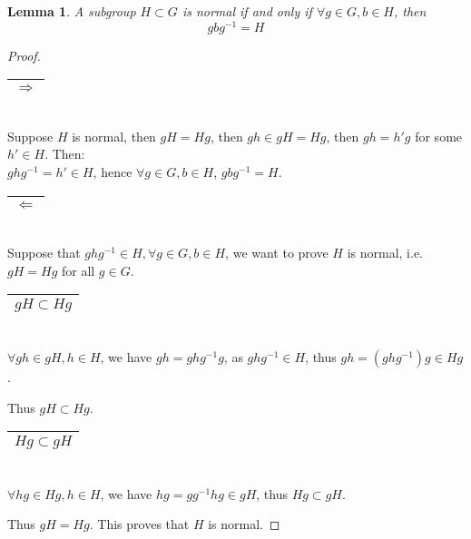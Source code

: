 \documentclass{article}
\theoremstyle{MyNonumberplain}
\theoremstyle{break}
\newtheorem*{proof}{Proof. }
\theoremstyle{break}
\newtheorem{lemma}[theorem]{Lemma}
\theoremstyle{break}
\theoremstyle{definition}
\theoremstyle{break}
\begin{document}
\begin{thmbox}
    \begin{lemma}
        A subgroup $H \subset G$ is normal if and only if $\forall g \in G, b \in H$,
        then
        \[ g b g^{- 1} = H \]
    \end{lemma}
    \begin{prfbox}
        \begin{proof}
            \begin{tabular}{|c|}
                \hline
                $\Rightarrow$\\
                \hline
              \end{tabular}\\
              
              Suppose $H$ is normal, then $g H = H g$, then $g h \in g H = H g$, then $g h =
              h' g$ for some $h' \in H$. Then:\\
              
              $g h g^{- 1} = h' \in H$, hence $\forall g \in G, b \in H$, $g b g^{- 1} =
              H$.\bigskip
              
              \begin{tabular}{|c|}
                \hline
                $\Leftarrow$\\
                \hline
              \end{tabular}\\
              
              Suppose that $g h g^{- 1} \in H, \forall g \in G, b \in H$, we want to prove
              $H$ is normal, i.e. $g H = H g$ for all $g \in G$.\bigskip
              
              \begin{tabular}{|c|}
                \hline
                $g H \subset H g$\\
                \hline
              \end{tabular}\\
              
              $\forall g h \in g H, h \in H$, we have $g h = g h g^{- 1} g$, as $g h g^{- 1}
              \in H$, thus $g h = (g h g^{- 1}) g \in H g$.\bigskip
              
              Thus $g H \subset H g$.\bigskip
              
              \begin{tabular}{|c|}
                \hline
                $H g \subset g H$\\
                \hline
              \end{tabular}\\
              
              $\forall h g \in H g, h \in H$, we have $h g = g g^{- 1} h g \in g H$, thus $H
              g \subset g H$.\bigskip
              
              Thus $g H = H g$. This proves that $H$ is normal.
        \end{proof}
    \end{prfbox}
\end{thmbox}
\end{document}
